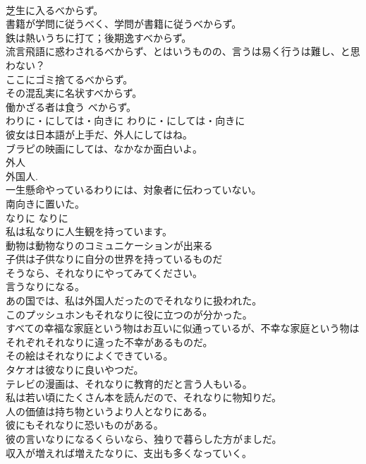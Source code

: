 \documentclass[8pt]{extreport}
\begin{document}
\begin{CJK}{UTF8}{min}
\\	芝生に入るべからず。   
\\	書籍が学問に従うべく、学問が書籍に従うべからず。   
\\	鉄は熱いうちに打て；後期逸すべからず。   
\\	流言飛語に惑わされるべからず、とはいうものの、言うは易く行うは難し、と思わない？   
\\	ここにゴミ捨てるべからず。   
\\	その混乱実に名状すべからず。   
\\	働かざる者は食う べからず。  
\\	わりに・にしては・向きに	わりに・にしては・向きに	
\\	彼女は日本語が上手だ、外人にしてはね。   
\\	ブラピの映画にしては、なかなか面白いよ。   
\\	外人 
\\	外国人. 
\\	一生懸命やっているわりには、対象者に伝わっていない。  
\\	南向きに置いた。  
\\	なりに	なりに	
\\	私は私なりに人生観を持っています。  
\\	動物は動物なりのコミュニケーションが出来る  
\\	子供は子供なりに自分の世界を持っているものだ  
\\	そうなら、それなりにやってみてください。  
\\	言うなりになる。  
\\	あの国では、私は外国人だったのでそれなりに扱われた。   
\\	このプッシュホンもそれなりに役に立つのが分かった。   
\\	すべての幸福な家庭という物はお互いに似通っているが、不幸な家庭という物はそれぞれそれなりに違った不幸があるものだ。  
\\	その絵はそれなりによくできている。   
\\	タケオは彼なりに良いやつだ。   
\\	テレビの漫画は、それなりに教育的だと言う人もいる。   
\\	私は若い頃にたくさん本を読んだので、それなりに物知りだ。   
\\	人の価値は持ち物というより人となりにある。   
\\	彼にもそれなりに恐いものがある。   
\\	彼の言いなりになるくらいなら、独りで暮らした方がましだ。   
\\	収入が増えれば増えたなりに、支出も多くなっていく。  

\end{CJK}
\end{document}
